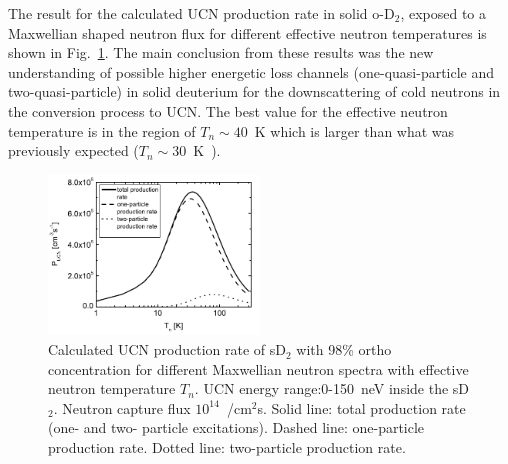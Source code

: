 
The result for the calculated UCN production rate in solid o-D$_2$,
exposed to a Maxwellian shaped neutron flux for different effective
neutron temperatures is shown in
Fig.~\ref{fig:sD2_production_rate}. The main conclusion from these
results was the new understanding of possible higher energetic loss
channels (one-quasi-particle and two-quasi-particle) in solid
deuterium for the downscattering of cold neutrons in the conversion
process to UCN. The best value for the effective neutron temperature
is in the region of $T_n \sim 40$~K which is larger than what was
previously expected ($T_n \sim 30$~K~\cite{Yu1986}).



\begin{figure}[h!]
\begin{center}
   \includegraphics[width=0.5\textwidth]{Frei2010_P.PNG} \caption{\cite{Frei2010}
    Calculated UCN production rate of sD$_2$ with 98\% ortho
    concentration for different Maxwellian neutron spectra with
    effective neutron temperature $T_n$. UCN energy range:0-150~neV
    inside the sD$_2$. Neutron capture flux $10^{14}$~/cm$^2$s. Solid
    line: total production rate (one- and two- particle
    excitations). Dashed line: one-particle production rate. Dotted
    line: two-particle production rate.}
    \label{fig:sD2_production_rate}
    \end{center}
\end{figure} 







